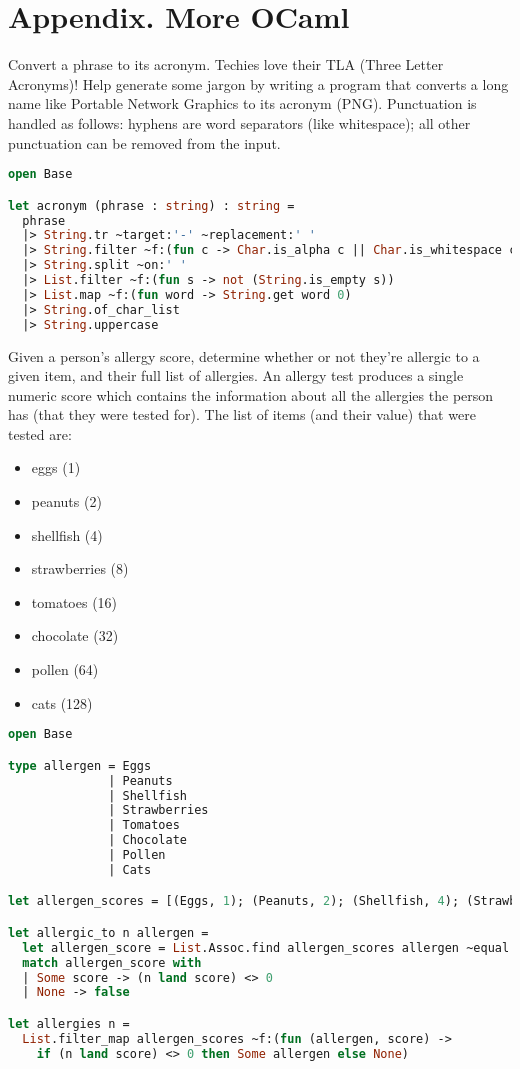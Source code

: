 \section*{Appendix. More OCaml}

Convert a phrase to its acronym.
Techies love their TLA (Three Letter Acronyms)!
Help generate some jargon by writing a program that converts a long name like Portable Network Graphics to its acronym (PNG).
Punctuation is handled as follows: hyphens are word separators (like whitespace); all other punctuation can be removed from the input.

\begin{lstlisting}[language=OCaml]
open Base

let acronym (phrase : string) : string =
  phrase
  |> String.tr ~target:'-' ~replacement:' '
  |> String.filter ~f:(fun c -> Char.is_alpha c || Char.is_whitespace c)
  |> String.split ~on:' '
  |> List.filter ~f:(fun s -> not (String.is_empty s))
  |> List.map ~f:(fun word -> String.get word 0)
  |> String.of_char_list
  |> String.uppercase
\end{lstlisting}

Given a person's allergy score, determine whether or not they're allergic to a given item, and their full list of allergies.
An allergy test produces a single numeric score which contains the information about all the allergies the person has (that they were tested for).
The list of items (and their value) that were tested are:

\begin{itemize}
  \item eggs (1)
  \item peanuts (2)
  \item shellfish (4)
  \item strawberries (8)
  \item tomatoes (16)
  \item chocolate (32)
  \item pollen (64)
  \item cats (128)
\end{itemize}

\begin{lstlisting}[language=OCaml]
open Base

type allergen = Eggs
              | Peanuts
              | Shellfish
              | Strawberries
              | Tomatoes
              | Chocolate
              | Pollen
              | Cats

let allergen_scores = [(Eggs, 1); (Peanuts, 2); (Shellfish, 4); (Strawberries, 8); (Tomatoes, 16); (Chocolate, 32); (Pollen, 64); (Cats, 128)]

let allergic_to n allergen =
  let allergen_score = List.Assoc.find allergen_scores allergen ~equal:Poly.equal in
  match allergen_score with
  | Some score -> (n land score) <> 0
  | None -> false

let allergies n =
  List.filter_map allergen_scores ~f:(fun (allergen, score) ->
    if (n land score) <> 0 then Some allergen else None)
\end{lstlisting}

